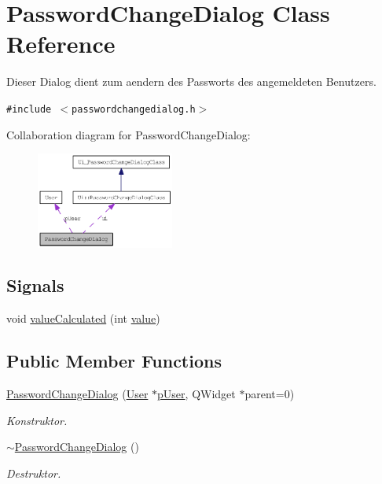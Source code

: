 \hypertarget{class_password_change_dialog}{
\section{PasswordChangeDialog Class Reference}
\label{class_password_change_dialog}
}
Dieser Dialog dient zum aendern des Passworts des angemeldeten Benutzers.  


{\tt \#include $<$passwordchangedialog.h$>$}

Collaboration diagram for PasswordChangeDialog:\nopagebreak
\begin{figure}[H]
\begin{center}
\leavevmode
\includegraphics[width=128pt]{class_password_change_dialog__coll__graph}
\end{center}
\end{figure}
\subsection*{Signals}
\begin{CompactItemize}
\item 
void \hyperlink{class_password_change_dialog_6fbe342d408b5f4250b472f33eeb6c8c}{valueCalculated} (int \hyperlink{_master_r_d_8h_ebadacfc123eafe0e9719ca0e1c37d79}{value})
\end{CompactItemize}
\subsection*{Public Member Functions}
\begin{CompactItemize}
\item 
\hyperlink{class_password_change_dialog_4a3b2b3c08acbfb3163084c6ac80cbe4}{PasswordChangeDialog} (\hyperlink{class_user}{User} $\ast$\hyperlink{class_password_change_dialog_251ff69dbc17e4169c3457f701683c7b}{pUser}, QWidget $\ast$parent=0)
\begin{CompactList}\small\item\em Konstruktor. \item\end{CompactList}\item 
\hyperlink{class_password_change_dialog_fadac897a16f4963b110ffab35efc771}{$\sim$PasswordChangeDialog} ()
\begin{CompactList}\small\item\em Destruktor. \item\end{CompactList}\end{CompactItemize}
